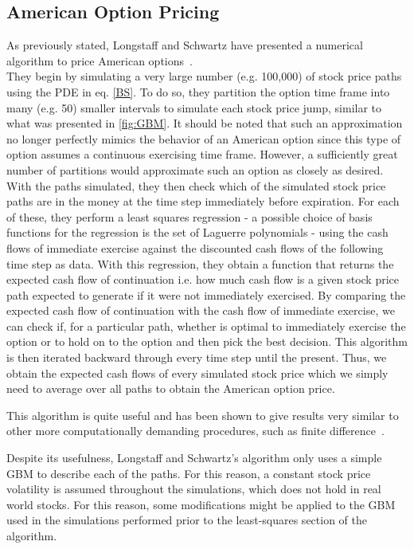 \documentclass[a4paper,twocolumn,aps,prd,longbibliography,superscriptaddress]{revtex4-1}
\begin{document}
\subsection{American Option Pricing}
As previously stated, Longstaff and Schwartz have presented a numerical algorithm to price American options~\cite{Longstaff}.\\
They begin by simulating a very large number (e.g. 100,000) of stock price paths using the PDE in eq. \eqref{BS}. To do so, they partition the option time frame into many (e.g. 50) smaller intervals to simulate each stock price jump, similar to what was presented in \autoref{fig:GBM}. It should be noted that such an approximation no longer perfectly mimics the behavior of an American option since this type of option assumes a continuous exercising time frame. However, a sufficiently great number of partitions would approximate such an option as closely as desired.\\
With the paths simulated, they then check which of the simulated stock price paths are in the money at the time step immediately before expiration. For each of these, they perform a least squares regression - a possible choice of basis functions for the regression is the set of Laguerre polynomials - using the cash flows of immediate exercise against the discounted cash flows of the following time step as data.
With this regression, they obtain a function that returns the expected cash flow of continuation i.e. how much cash flow is a given stock price path expected to generate if it were not immediately exercised.
By comparing the expected cash flow of continuation with the cash flow of immediate exercise, we can check if, for a particular path, whether is optimal to immediately exercise the option or to hold on to the option and then pick the best decision.
This algorithm is then iterated backward through every time step until the present.
Thus, we obtain the expected cash flows of every simulated stock price which we simply need to average over all paths to obtain the American option price.

This algorithm is quite useful and has been shown to give results very similar to other more computationally demanding procedures, such as finite difference~\cite{Longstaff}.

Despite its usefulness, Longstaff and Schwartz's algorithm only uses a simple GBM to describe each of the paths. For this reason, a constant stock price volatility is assumed throughout the simulations, which does not hold in real world stocks.
For this reason, some modifications might be applied to the GBM used in the simulations performed prior to the least-squares section of the algorithm.
\end{document}
